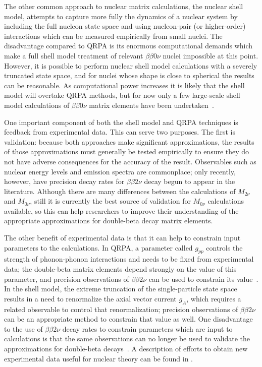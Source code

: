 The other common approach to nuclear matrix calculations, the nuclear shell model, attempts to capture more fully the dynamics of a nuclear system by including the full nucleon state space and using nucleon-pair (or higher-order) interactions which can be measured empirically from small nuclei.  The disadvantage compared to QRPA is its enormous computational demands which make a full shell model treatment of relevant $\beta\beta 0\nu$ nuclei impossible at this point.  However, it is possible to perform nuclear shell model calculations with a severely truncated state space, and for nuclei whose shape is close to spherical the results can be reasonable.  As computational power increases it is likely that the shell model will overtake QRPA methods, but for now only a few large-scale shell model calculations of $\beta\beta 0\nu$ matrix elements have been undertaken~\cite{RMPbb0n}.

One important component of both the shell model and QRPA techniques is feedback from experimental data.  This can serve two purposes.  The first is validation: because both approaches make significant approximations, the results of those approximations must generally be tested empirically to ensure they do not have adverse consequences for the accuracy of the result.  Observables such as nuclear energy levels and emission spectra are commonplace; only recently, however, have precision decay rates for $\beta\beta 2\nu$ decay begun to appear in the literature.  Although there are many differences between the calculations of $M_{2\nu}$ and $M_{0\nu}$, still it is currently the best source of validation for $M_{0\nu}$ calculations available, so this can help researchers to improve their understanding of the appropriate approximations for double-beta decay matrix elements.

The other benefit of experimental data is that it can help to constrain input parameters to the calculations.  In QRPA, a parameter called $g_{pp}$ controls the strength of phonon-phonon interactions and needs to be fixed from experimental data; the double-beta matrix elements depend strongly on the value of this parameter, and precision observations of $\beta\beta 2\nu$ can be used to constrain its value~\cite{RMPbb0n,PetrVogel0nuAnd2nuMatrixElements}.  In the shell model, the extreme truncation of the single-particle state space results in a need to renormalize the axial vector current $g_A$, which requires a related observable to control that renormalization; precision observations of $\beta\beta 2\nu$ can be an appropriate method to constrain that value as well.  One disadvantage to the use of $\beta\beta 2\nu$ decay rates to constrain parameters which are input to calculations is that the same observations can no longer be used to validate the approximations for double-beta decays~\cite{PetrVogel0nuAnd2nuMatrixElements}.  A description of efforts to obtain new experimental data useful for nuclear theory can be found in \cite{ZuberWorkshop}.


